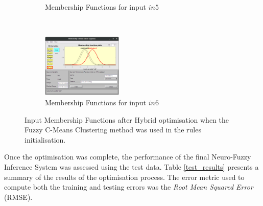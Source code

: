 \documentclass[11pt]{article}
\begin{document}
\begin{figure}[ht]
\begin{subfigure}[t]{0.3\textwidth}
		\caption{Membership Functions for input $in5$}
	\end{subfigure}
	~
	\begin{subfigure}[t]{0.3\textwidth}
		\centering
		\includegraphics[height=1.2in]{images/fcm_hybrid_in6}
		\caption{Membership Functions for input $in6$}
	\end{subfigure}
	\caption{Input Membership Functions after Hybrid optimisation when the Fuzzy C-Means Clustering method was used in the rules initialisation.}
\end{figure}

Once the optimisation was complete, the performance of the final Neuro-Fuzzy Inference System was assessed using the test data. Table \ref{test_results} presents a summary of the results of the optimisation process. The error metric used to compute both the training and testing errors was the \emph{Root Mean Squared Error} (RMSE).
\end{document}
